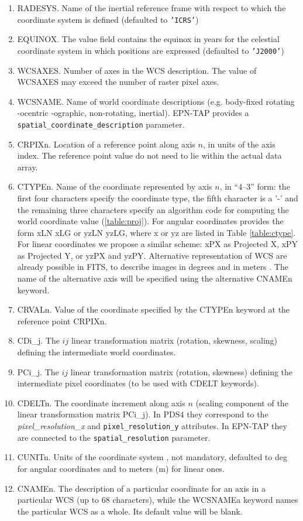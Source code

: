 \begin{enumerate}
\item{RADESYS.
Name of the inertial reference frame with respect to which the coordinate
system is defined (defaulted to \texttt{'ICRS'})}
\item{EQUINOX.
The value field contains the equinox in years for the celestial
coordinate system in which positions are expressed (defaulted to \texttt{'J2000'})}
\item{WCSAXES.
Number of axes in the WCS description.
The value of WCSAXES may exceed the number of raster pixel axes.}
\item{WCSNAME.
Name of world coordinate descriptions (e.g. body-fixed rotating -ocentric -ographic,
non-rotating, inertial).
EPN-TAP provides a \texttt{spatial\_coordinate\_description} parameter.}
\item{CRPIXn.
Location of a reference point along axis $n$, in units of the axis index.
The reference point value do not need to lie within the actual data array.}
\item{CTYPEn.
Name of the coordinate represented by axis $n$, in “4–3” form: the first four characters
specify the coordinate type, the fifth character is a '-' and the
remaining three characters specify an algorithm code for computing the world coordinate
value (\ref{table:proj}).
For angular coordinates \citet{calagreisenI} provides the form xLN xLG or yzLN yzLG, where x or yz
are listed in Table \ref{table:ctype}.
For linear coordinates we propose a similar scheme: xPX as Projected X, xPY as Projected Y,
or yzPX and yzPY.
Alternative representation of WCS are already possible in FITS, to describe images in degrees
and in meters \citep{greisencalaII}.
The name of the alternative axis will be specified using the alternative CNAMEn keyword.}
\item{CRVALn.
Value of the coordinate specified by the CTYPEn keyword at the reference point CRPIXn.}
\item{CDi\_j.
The $ij$ linear transformation matrix (rotation, skewness, scaling) defining the intermediate
world coordinates.}
\item{PCi\_j.
The $ij$ linear transformation matrix (rotation, skewness) defining the intermediate pixel
coordinates (to be used with CDELT keywords).}
\item{CDELTn.
The coordinate increment along axis $n$ (scaling component of the linear transformation
matrix PCi\_j).
In PDS4 they correspond to the \textit{pixel\_resolution\_x} and \texttt{pixel\_resolution\_y}
attributes.
In EPN-TAP they are connected to the \texttt{spatial\_resolution} parameter.}
\item{CUNITn.
Units of the coordinate system , not mandatory, defaulted to deg for angular coordinates
and to meters (m) for linear ones.}
\item{CNAMEn.
The description of a particular coordinate for an axis in a particular WCS (up to 68
characters), while the WCSNAMEa keyword names the particular WCS as a whole.
Its default value will be blank.}
\end{enumerate}

